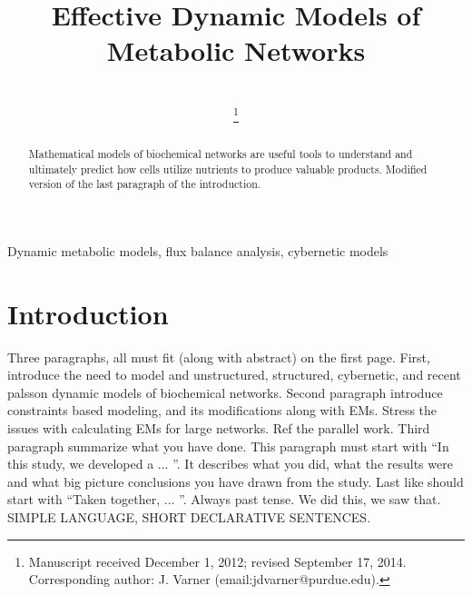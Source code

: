 \documentclass[10pt,twocolumn,twoside,final]{IEEEtran}
\begin{document}
\title{Effective Dynamic Models of Metabolic Networks}


\author{\\
\thanks{Manuscript received December 1, 2012; revised September 17, 2014.
Corresponding author: J. Varner (email:jdvarner@purdue.edu).}}

\maketitle

\begin{abstract}
Mathematical models of biochemical networks are useful tools to understand and ultimately predict how cells utilize nutrients to produce valuable products.
Modified version of the last paragraph of the introduction.

\end{abstract}


\begin{IEEEkeywords}
Dynamic metabolic models, flux balance analysis, cybernetic models
\end{IEEEkeywords}

\section{Introduction}
Three paragraphs, all must fit (along with abstract) on the first page.
First, introduce the need to model and unstructured, structured, cybernetic, and recent palsson dynamic models of biochemical networks.
Second paragraph introduce constraints based modeling, and its modifications along with EMs. Stress the issues with calculating EMs for large networks. Ref the parallel work.
Third paragraph summarize what you have done. This paragraph must start with ``In this study, we developed a ... ''. It describes what you did, what the results were and what big picture conclusions you have drawn from the study. Last like should start with ``Taken together, ... ''. Always past tense. We did this, we saw that. SIMPLE LANGUAGE, SHORT DECLARATIVE SENTENCES.
\end{document}
